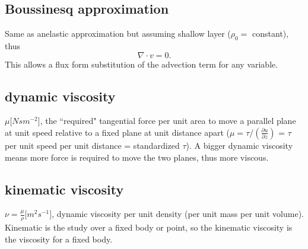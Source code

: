 \subsection{Boussinesq approximation} \begin{defn*} Same as anelastic approximation but assuming
shallow layer ($\rho_0 = $ constant), thus \begin{equation} \nabla \cdot v = 0.  \end{equation} This
allows a flux form substitution of the advection term for any variable. \end{defn*}


\subsection{dynamic viscosity} 
\begin{defn*} 
$\mu \big[ N s m^{-2}\big]$, the ``required" tangential force per unit area to move a parallel plane
at unit speed relative to a fixed plane at unit distance apart ($\mu = \tau/(\frac{\partial
u}{\partial z})$ = $\tau$ per unit speed per unit distance = standardized $\tau$). A bigger dynamic
viscosity  means more force is required to move
the two planes, thus more viscous.
\end{defn*}

\subsection{kinematic viscosity}
\begin{defn*} 
$\nu = \frac{\mu}{\rho} \big[ m^2 s^{-1}\big]$, dynamic viscosity per unit density (per unit mass
per unit volume). Kinematic is the study over a fixed body or point, so the kinematic viscosity is
the viscosity for a fixed body.
\end{defn*}


